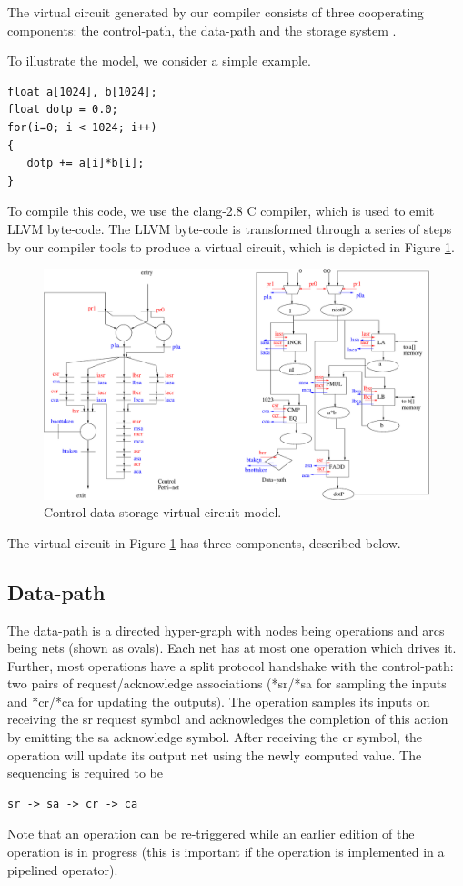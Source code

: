 \documentclass[conference]{IEEEtran}
\begin{document}
The virtual circuit generated by our compiler consists of three
cooperating components: the control-path, the data-path and
the storage system \cite{ahirDsd2010}.

To illustrate the model, we consider a simple example.
\begin{verbatim}
float a[1024], b[1024];
float dotp = 0.0;
for(i=0; i < 1024; i++)
{
   dotp += a[i]*b[i];
}
\end{verbatim}
To compile this code, we use the clang-2.8  C compiler, 
which is used to emit LLVM byte-code.  The LLVM byte-code
is transformed through a series of steps by our compiler tools to
produce a virtual circuit, which is depicted in Figure \ref{fig:dotP}.
\begin{figure}[ht]
  \centering
  \includegraphics[width=15cm]{dotP.eps}
  \caption{Control-data-storage virtual circuit model.}
  \label{fig:dotP}
\end{figure}
The virtual circuit in Figure \ref{fig:dotP} has three components,
described below.


\subsection{Data-path}
The data-path is a directed hyper-graph with nodes being
operations and arcs being nets (shown as ovals).  Each
net has at most one operation which drives it.  Further, most
operations have  a split protocol handshake with
the control-path:  two pairs of request/acknowledge 
associations (*sr/*sa for sampling the inputs  and *cr/*ca for
updating the outputs).    The operation samples its inputs
on receiving the sr request symbol and acknowledges the completion
of this action by emitting the sa acknowledge symbol.  After receiving
the cr symbol, the operation will update its output net
using the newly computed value. The sequencing is required to be
\begin{verbatim}
sr -> sa -> cr -> ca
\end{verbatim}
Note that an operation can be re-triggered while an earlier
edition of the operation
is in progress (this is important if the operation is implemented
in a pipelined operator).
\end{document}
